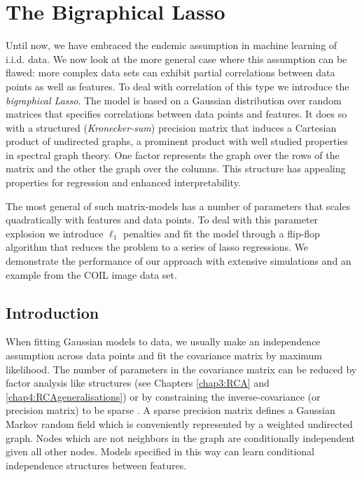 \chapter[The Bigraphical Lasso]{The Bigraphical Lasso} \label{chap6:BiGLasso}
\ifpdf
    \graphicspath{{Chapter6/Chapter6Figs/PNG/}{Chapter6/Chapter6Figs/PDF/}{Chapter6/Chapter6Figs/}}
\else
    \graphicspath{{Chapter6/Chapter6Figs/EPS/}{Chapter6/Chapter6Figs/}}
\fi

  
  Until now, we have embraced the endemic assumption in machine learning of i.i.d. data.
  We now look at the more general case where this assumption can be flawed: more complex data sets
  can exhibit partial correlations between data points as well as features.
  To deal with correlation of this type we introduce the \emph{bigraphical Lasso}.
  The model is based on a Gaussian distribution over random matrices that specifies correlations between data points and features.
  It does so with a structured (\emph{Kronecker-sum}) precision matrix that induces a Cartesian product of undirected graphs, a prominent product with well studied properties in spectral graph theory.
  One factor represents the graph over the rows of the matrix and the other the graph over the columns.
  This structure has appealing properties for regression and enhanced interpretability.
  
  The most general of such matrix-models has a number of parameters that scales quadratically with features and data points.
  To deal with this parameter explosion we introduce $\ell_1$ penalties and fit the model through a flip-flop algorithm that reduces the problem to a series of lasso regressions.
   We demonstrate the performance of our approach with extensive simulations and an example from the COIL image data set.
    
    
  \section{Introduction}
  
  
    When fitting Gaussian models to data, we usually make an independence assumption across data points and fit the covariance matrix by maximum likelihood.
  The number of parameters in the covariance matrix can be reduced by factor analysis like structures (see Chapters \ref{chap3:RCA} and \ref{chap4:RCAgeneralisations})
  or by constraining the inverse-covariance (or precision matrix) to be sparse \citep[e.g.][]{Banerjee:model2008}.
  A sparse precision matrix defines a Gaussian Markov random field which is conveniently represented by a weighted undirected graph.
  Nodes which are not neighbors in the graph are conditionally independent given all other nodes.
  Models specified in this way can learn conditional independence structures between features.


